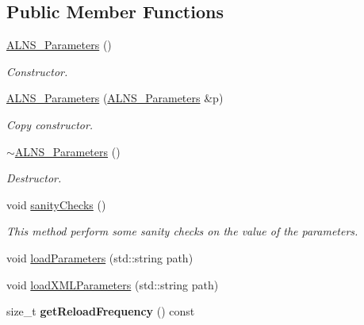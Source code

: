 \subsection*{Public Member Functions}
\begin{DoxyCompactItemize}
\item 
\hypertarget{classALNS__Parameters_a361ec5dedae42ac8ef4e15bac35ffc5b}{\hyperlink{classALNS__Parameters_a361ec5dedae42ac8ef4e15bac35ffc5b}{A\-L\-N\-S\-\_\-\-Parameters} ()}\label{classALNS__Parameters_a361ec5dedae42ac8ef4e15bac35ffc5b}

\begin{DoxyCompactList}\small\item\em Constructor. \end{DoxyCompactList}\item 
\hypertarget{classALNS__Parameters_a009eb8cb2d8b5de326cb945592b5f927}{\hyperlink{classALNS__Parameters_a009eb8cb2d8b5de326cb945592b5f927}{A\-L\-N\-S\-\_\-\-Parameters} (\hyperlink{classALNS__Parameters}{A\-L\-N\-S\-\_\-\-Parameters} \&p)}\label{classALNS__Parameters_a009eb8cb2d8b5de326cb945592b5f927}

\begin{DoxyCompactList}\small\item\em Copy constructor. \end{DoxyCompactList}\item 
\hypertarget{classALNS__Parameters_a6862d124475b2a0c24141c233ea70ac8}{\hyperlink{classALNS__Parameters_a6862d124475b2a0c24141c233ea70ac8}{$\sim$\-A\-L\-N\-S\-\_\-\-Parameters} ()}\label{classALNS__Parameters_a6862d124475b2a0c24141c233ea70ac8}

\begin{DoxyCompactList}\small\item\em Destructor. \end{DoxyCompactList}\item 
\hypertarget{classALNS__Parameters_a271ab0a53b41317dad182fdb4f11ac61}{void \hyperlink{classALNS__Parameters_a271ab0a53b41317dad182fdb4f11ac61}{sanity\-Checks} ()}\label{classALNS__Parameters_a271ab0a53b41317dad182fdb4f11ac61}

\begin{DoxyCompactList}\small\item\em This method perform some sanity checks on the value of the parameters. \end{DoxyCompactList}\item 
void \hyperlink{classALNS__Parameters_afdafe8203131ddbea64ae09548de4fa4}{load\-Parameters} (std\-::string path)
\item 
void \hyperlink{classALNS__Parameters_a985158e9df4d28113d8e973d0f8d6870}{load\-X\-M\-L\-Parameters} (std\-::string path)
\item 
\hypertarget{classALNS__Parameters_a9c2b89225ffc40f286b6685fc2dc12cf}{size\-\_\-t {\bfseries get\-Reload\-Frequency} () const }\label{classALNS__Parameters_a9c2b89225ffc40f286b6685fc2dc12cf}


\end{DoxyCompactItemize}

